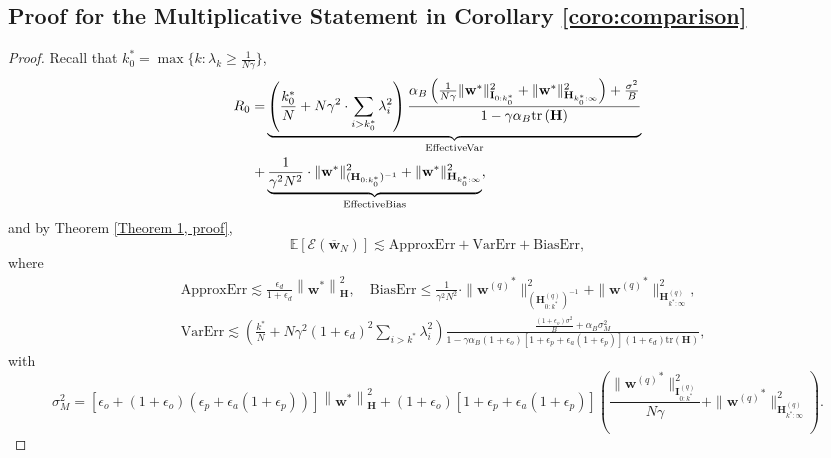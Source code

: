 \documentclass[11pt, letterpaper]{article}
\begin{document}
\subsection{Proof for the Multiplicative Statement in Corollary \ref{coro:comparison}}
\label{Proof for Theorem 11}
\begin{proof}
    Recall that $k_0^*=\max\{k: \lambda_k \geq \frac{1}{N\gamma}\}$,
    \begin{equation*}
        \begin{aligned}
            R_0=&\underbrace{\left(\frac{k_0^*}{N}+N\gamma^2\cdot\sum_{i>k_0^*}\lambda_i^2\right)\frac{\alpha_B\left(\frac{1}{N\gamma}\|{\mathbf{w}}^*\|_{\mathbf{I}_{0:k_0^*}}^2+\|{\mathbf{w}}^*\|_{\mathbf{H}_{k_0^*:\infty}}^2\right)
            +\frac{\sigma^2}{B}}{1-\gamma\alpha_B\mathrm{tr}\left(\mathbf{H}\right)}}_{\rm EffectiveVar}\\
            +&\underbrace{\frac{1}{\gamma^2N^2}\cdot\|      {\mathbf{w}}^*\|_{(\mathbf{H}_{0:k_0^*})^{-1}}^2+\|{\mathbf{w}}^*\|_{\mathbf{H}_{k_0^*:\infty}}^2}_{\rm EffectiveBias},
        \end{aligned}
    \end{equation*}
    and by Theorem \ref{Theorem 1, proof},
    \begin{equation*}
        \mathbb{E}[\mathcal{E}(\overline{\mathbf{w}}_N)] \lesssim \mathrm{ApproxErr}+\mathrm{VarErr}+\mathrm{BiasErr},
    \end{equation*}
    where
    \begin{equation*}
        \begin{aligned}
            &\mathrm{ApproxErr}\lesssim \frac{\epsilon_d}{1+\epsilon_d}\left\|\mathbf{w}^*\right\|_\mathbf{H}^2,\quad \mathrm{BiasErr}\leq\frac{1}{\gamma^2N^2}\cdot\|{\mathbf{w}^{(q)}}^*\|_{(\mathbf{H}_{0:k^*}^{(q)})^{-1}}^2+\|{\mathbf{w}^{(q)}}^*\|_{\mathbf{H}_{k^*:\infty}^{(q)}}^2,\\
            &\mathrm{VarErr}\lesssim\left(\frac{k^*}{N}+N\gamma^2(1+\epsilon_d)^2\sum_{i>k^*}\lambda_i^2\right) \frac{\frac{(1+\epsilon_o)\sigma^2}{B}+\alpha_B\sigma_M^2}{1-\gamma\alpha_B(1+\epsilon_o)[1+\epsilon_p+\epsilon_a(1+\epsilon_p)](1+\epsilon_d)\mathrm{tr}\left(\mathbf{H}\right)},
        \end{aligned}
    \end{equation*}
    with 
    \begin{equation*}
        \sigma_M^2=[\epsilon_o+(1+\epsilon_o)(\epsilon_p+\epsilon_a(1+\epsilon_p))]\left\|\mathbf{w}^*\right\|_\mathbf{H}^2
        +(1+\epsilon_o)[1+\epsilon_p+\epsilon_a(1+\epsilon_p)]\left(\frac{\|{\mathbf{w}^{(q)}}^*\|_{\mathbf{I}_{0:k^*}^{(q)}}^2}{N\gamma}+\|{\mathbf{w}^{(q)}}^*\|_{\mathbf{H}_{k^*:\infty}^{(q)}}^2\right).
    \end{equation*}
    

\end{proof}
\end{document}

